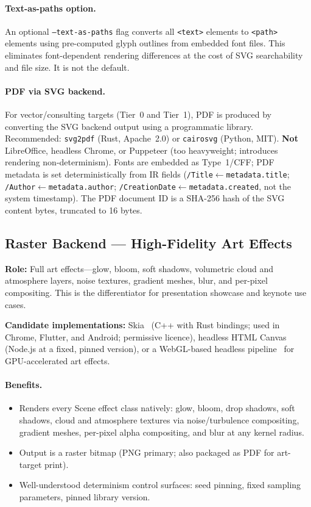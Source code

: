 \paragraph{Text-as-paths option.}
An optional \texttt{--text-as-paths} flag converts all \texttt{<text>} elements to
\texttt{<path>} elements using pre-computed glyph outlines from embedded font files.
This eliminates font-dependent rendering differences at the cost of SVG searchability and
file size. It is not the default.

\paragraph{PDF via SVG backend.}
For vector/consulting targets (Tier~0 and Tier~1), PDF is produced by converting the SVG
backend output using a programmatic library. Recommended: \texttt{svg2pdf} (Rust,
Apache~2.0) or \texttt{cairosvg} (Python, MIT). \textbf{Not} LibreOffice, headless Chrome,
or Puppeteer (too heavyweight; introduces rendering non-determinism). Fonts are embedded
as Type~1/CFF; PDF metadata is set deterministically from IR fields
(\texttt{/Title}$\leftarrow$\texttt{metadata.title};
\texttt{/Author}$\leftarrow$\texttt{metadata.author};
\texttt{/CreationDate}$\leftarrow$\texttt{metadata.created}, not the system timestamp).
The PDF document ID is a SHA-256 hash of the SVG content bytes, truncated to 16 bytes.

\subsection{Raster Backend --- High-Fidelity Art Effects}
\label{sec:output-raster}

\textbf{Role:} Full art effects---glow, bloom, soft shadows, volumetric cloud and
atmosphere layers, noise textures, gradient meshes, blur, and per-pixel compositing.
This is the differentiator for presentation showcase and keynote use cases.

\textbf{Candidate implementations:} Skia~\cite{skia} (C++ with Rust bindings; used in
Chrome, Flutter, and Android; permissive licence), headless HTML
Canvas~\cite{webgl} (Node.js at a fixed, pinned version), or a WebGL-based headless
pipeline~\cite{webgl} for GPU-accelerated art effects.

\paragraph{Benefits.}
\begin{itemize}
  \item Renders every Scene effect class natively: glow, bloom, drop shadows, soft
        shadows, cloud and atmosphere textures via noise/turbulence compositing, gradient
        meshes, per-pixel alpha compositing, and blur at any kernel radius.
  \item Output is a raster bitmap (PNG primary; also packaged as PDF for art-target print).
  \item Well-understood determinism control surfaces: seed pinning, fixed sampling
        parameters, pinned library version.
\end{itemize}

